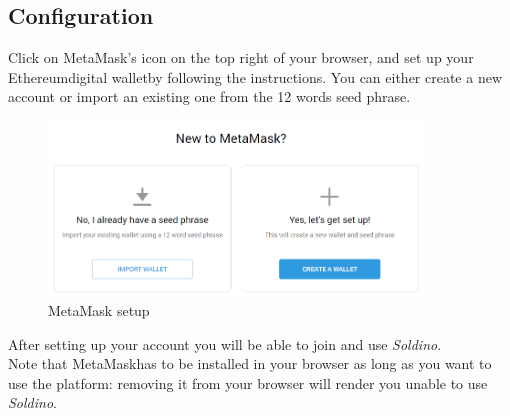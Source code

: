 	\subsection{Configuration}
	Click on MetaMask's icon on the top right of your browser, and set up your 
	Ethereum\glosp digital wallet\glosp by following the instructions. You can either 
	create a new account or import an existing one from the 12 words seed phrase.
	\begin{figure}[H]
		\includegraphics[width=10cm]{res/images/metamask_select.png}
		\centering
		\caption{MetaMask setup}
	\end{figure}
	\noindent After setting up your account you will be able to join and use 
	\textit{Soldino}.
	\newline \\
	Note that MetaMask\glosp has to be installed in your browser as long as you want 
	to use the platform: removing it from your browser will render you unable 
	to use \textit{Soldino}.
